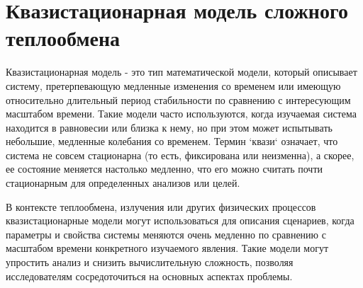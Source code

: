 \section{Квазистационарная модель сложного теплообмена}\label{sec:ch1/sec4}
Квазистационарная модель - это тип математической модели,
который описывает систему, претерпевающую медленные изменения
со временем или имеющую относительно длительный период стабильности
по сравнению с интересующим масштабом времени.
Такие модели часто используются, когда изучаемая система находится
в равновесии или близка к нему, но при этом может испытывать небольшие,
медленные колебания со временем.
Термин `квази` означает,
что система не совсем стационарна (то есть, фиксирована или неизменна),
а скорее, ее состояние меняется настолько медленно, что его можно считать
почти стационарным для определенных анализов или целей.

В контексте теплообмена, излучения или других физических процессов
квазистационарные модели могут использоваться для описания сценариев,
когда параметры и свойства системы меняются очень медленно по сравнению
с масштабом времени конкретного изучаемого явления.
Такие модели могут упростить анализ и снизить вычислительную сложность,
позволяя исследователям сосредоточиться на основных аспектах проблемы.
